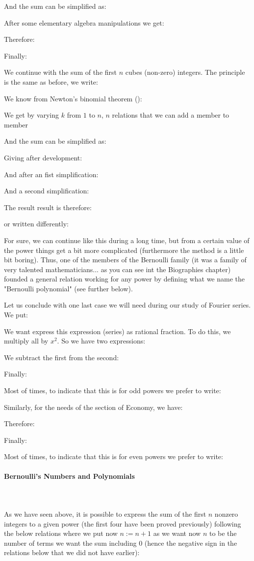 	And the sum can be simplified as:
	
	After some elementary algebra manipulations we get:
	
	Therefore:
	
	Finally:
	
	We continue with the sum of the first $n$ cubes (non-zero) integers. The principle is the same as before, we write:
	
	We know from Newton's binomial theorem ():
	
	We get by varying $k$ from $1$ to $n$, $n$ relations that we can add a member to member
	
	And the sum can be simplified as:
	
	Giving after development:
	
	And after an fist simplification:
	
	And a second simplification:
	
	The result result is therefore:
	
	or written differently:
	
	For sure, we can continue like this during a long time, but from a certain value of the power things get a bit more complicated (furthermore the method is a little bit boring). Thus, one of the members of the Bernoulli family (it was a family of very talented mathematicians... as you can see int the Biographies chapter) founded a general relation working for any power by defining what we name the "Bernoulli polynomial" (see further below).
	
	Let us conclude with one last case we will need during our study of Fourier series. We put:
	
	We want express this expression (series) as rational fraction. To do this, we multiply all by $x^2$. So we have two expressions:
	
	We subtract the first from the second:
	
	Finally:
	
	Most of times, to indicate that this is for odd powers we prefer to write:
	
	Similarly, for the needs of the section of Economy, we have:
	
	Therefore:
	
	Finally:
	
	Most of times, to indicate that this is for even powers we prefer to write:
	
	\paragraph{Bernoulli's Numbers and Polynomials}\mbox{}\\\\
	As we have seen above, it is possible to express the sum of the first $n$ nonzero integers to a given power (the first four have been proved previously) following the below relations where we put now $n:=n+1$ as we want now $n$ to be the number of terms we want the sum including 0 (hence the negative sign in the relations below that we did not have earlier):
	
